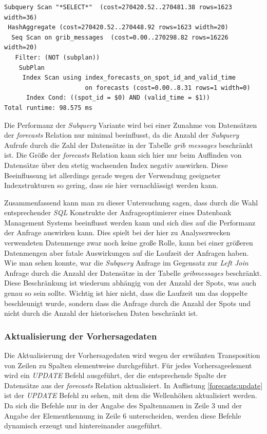 \begin{lstlisting}[captionpos=b, caption=Ausführungsplan der Subquery, label=forecasts:explain_2]
Subquery Scan "*SELECT*"  (cost=270420.52..270481.38 rows=1623 width=36)
 HashAggregate (cost=270420.52..270448.92 rows=1623 width=20)
  Seq Scan on grib_messages  (cost=0.00..270298.82 rows=16226 width=20)
   Filter: (NOT (subplan))
    SubPlan
     Index Scan using index_forecasts_on_spot_id_and_valid_time 
                      on forecasts (cost=0.00..8.31 rows=1 width=0)
      Index Cond: ((spot_id = $0) AND (valid_time = $1))
Total runtime: 98.575 ms
\end{lstlisting}

Die Performanz der \textit{Subquery} Variante wird bei einer Zunahme
von Datensätzen der \textit{forecasts} Relation nur minimal
beeinflusst, da die Anzahl der \textit{Subquery} Aufrufe durch die
Zahl der Datensätze in der Tabelle \textit{grib\textunderscore
  messages} beschränkt ist. Die Größe der \textit{forecasts} Relation
kann sich hier nur beim Auffinden von Datensätze über den stetig
wachsenden Index negativ auswirken. Diese Beeinflussung ist allerdings
gerade wegen der Verwendung geeigneter Indexstrukturen so gering, dass
sie hier vernachlässigt werden kann.

Zusammenfassend kann man zu dieser Untersuchung sagen, dass durch die
Wahl entsprechender \textit{SQL} Konstrukte der Anfrageoptimierer
eines Datenbank Management Systems beeinflusst werden kann und sich
dies auf die Performanz der Anfrage auswirken kann. Dies spielt bei
der hier zu Analysezwecken verwendeten Datenmenge zwar noch keine
große Rolle, kann bei einer größeren Datenmengen aber fatale
Auswirkungen auf die Laufzeit der Anfragen haben. Wie man sehen
konnte, war die \textit{Subquery} Anfrage im Gegensatz zur
\textit{Left Join} Anfrage durch die Anzahl der Datensätze in der
Tabelle \textit{grib\textunderscore messages} beschränkt. Diese
Beschränkung ist wiederum abhängig von der Anzahl der Spots, was auch
genau so sein sollte. Wichtig ist hier nicht, dass die Laufzeit um das
doppelte beschleunigt wurde, sondern dass die Anfrage durch die Anzahl
der Spots und nicht durch die Anzahl der historischen Daten beschränkt
ist.

\subsubsection{Aktualisierung der Vorhersagedaten}
Die Aktualisierung der Vorhersagedaten wird wegen der erwähnten
Transposition von Zeilen zu Spalten elementweise durchgeführt. Für
jedes Vorhersageelement wird ein \textit{UPDATE} Befehl ausgeführt,
der die entsprechende Spalte der Datensätze aus der \textit{forecasts}
Relation aktualisiert. In Auflistung \ref{forecasts:update} ist der
\textit{UPDATE} Befehl zu sehen, mit dem die Wellenhöhen aktualisiert
werden. Da sich die Befehle nur in der Angabe des Spaltennamen in
Zeile 3 und der Angabe der Elementkennung in Zeile 6 unterscheiden,
werden diese Befehle dynamisch erzeugt und hintereinander ausgeführt.

